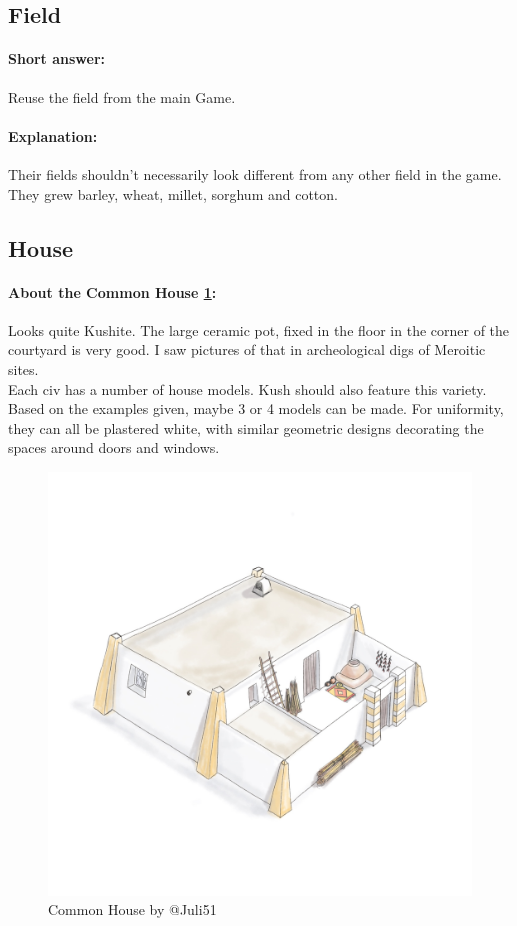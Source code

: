\documentclass[a4paper,12pt]{scrreprt}
\begin{document}
\subsection{Field}

\paragraph{Short answer:} Reuse the field from the main Game.

\paragraph{Explanation:}

Their fields shouldn’t necessarily look different from any other field in the game. They grew barley, wheat, millet, sorghum and cotton.

\subsection{House}

\paragraph{About the Common House \ref{fig:common_house}:} Looks quite Kushite. The large ceramic pot, fixed in the floor in the corner of the courtyard is very good. I saw pictures of that in archeological digs of Meroitic sites.\\

Each civ has a number of house models. Kush should also feature this variety. Based on the examples given, maybe 3 or 4 models can be made. For uniformity, they can all be plastered white, with similar geometric designs decorating the spaces around doors and windows. 

\begin{figure}[H]
	\centering
	\includegraphics[width=\textwidth]{img/house/juli51_common_house}
	\caption{Common House by @Juli51}\label{fig:common_house}
\end{figure}
\end{document}
